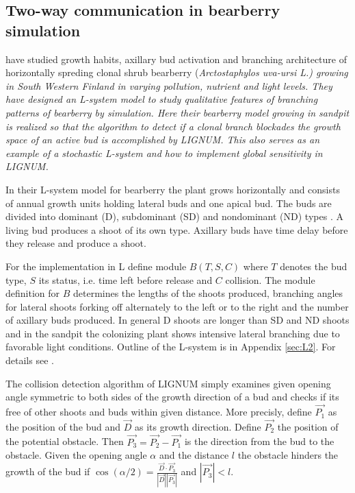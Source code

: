 \subsection{Two-way communication in bearberry simulation}\label{sec:bearberry}

\citet{salemaa:02} have studied growth habits, axillary bud activation
and  branching  architecture  of  horizontally spreding  clonal  shrub
bearberry  (\it  Arctostaphylos uva-ursi  \rm  L.)   growing in  South
Western Finland in varying pollution, nutrient and light levels.  They
have  designed an  L-system  model to  study  qualitative features  of
branching patterns  of bearberry by simulation.   Here their bearberry
model growing in  sandpit is realized so that  the algorithm to detect
if a  clonal branch  blockades the  growth space of  an active  bud is
accomplished  by  LIGNUM.   This  also  serves  as  an  example  of  a
stochastic  L-system   \citep{pp:90}  and  how   to  implement  global
sensitivity \citep{kurth:94} in LIGNUM.

In  their L-system  model for  bearberry \citep{salemaa:02}  the plant
grows horizontally and consists of annual growth units holding lateral
buds  and one apical  bud.  The  buds are  divided into  dominant (D),
subdominant  (SD) and nondominant  (ND) types  \citep{remphrey:83}.  A
living bud produces a shoot of  its own type.  Axillary buds have time
delay before they release and produce a shoot.

For the implementation in L define module $B(T,S,C)$ where $T$ denotes
the bud type,  $S$ its status, i.e.  time left  before release and $C$
collision.  The  module definition for  $B$ determines the  lengths of
the shoots  produced, branching angles for lateral  shoots forking off
alternately to  the left or  to the right  and the number  of axillary
buds produced.  In  general D shoots are longer than  SD and ND shoots
and  in  the sandpit  the  colonizing  plant  shows intensive  lateral
branching due to favorable  light conditions.  Outline of the L-system
is in Appendix \ref{sec:L2}.  For details see \citet{salemaa:02}.

The  collision detection  algorithm  of LIGNUM  simply examines  given
opening angle symmetric to both sides of the growth direction of a bud
and checks if its free of other shoots and buds within given distance.
More  precisly, define $\vec  {P_1}$ as  the position  of the  bud and
$\vec D$ as its growth  direction. Define $\vec {P_2}$ the position of
the potential obstacle. Then $\vec {P_3} = \vec {P_2} - \vec {P_1}$ is
the direction from  the bud to the obstacle.   Given the opening angle
$\alpha$ and the  distance $l$ the obstacle hinders  the growth of the
bud  if $\cos(\alpha/2) =  \frac{{\vec D}  \cdot {\vec  {P_3}}} {|\vec
D||\vec {P_3}|}$ and $|\vec {P_3}| < l$.

